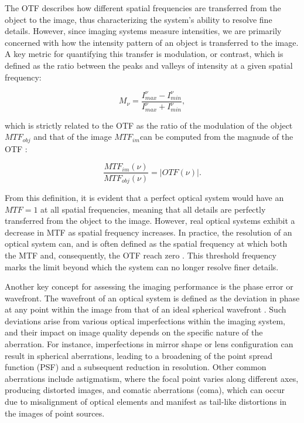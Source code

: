 The OTF describes how different spatial frequencies are transferred from the object to the image, thus characterizing the system's ability to resolve fine details. However, since imaging systems measure intensities, we are primarily concerned with how the intensity pattern of an object is transferred to the image. A key metric for quantifying this transfer is modulation, or contrast, which is defined as the ratio between the peaks and valleys of intensity at a given spatial frequency:

\begin{equation}
  M _ {\nu} = \frac{I_{max} ^{\nu} - I_{min} ^{\nu}}{I_{max} ^{\nu} + I_{min} ^{\nu}},
\end{equation}

which is strictly related to the OTF as the ratio of the modulation of the object $MTF_{obj}$ and that of the image $MTF_{im} $can be computed from the magnude of the OTF \citep{OTF}:

\begin{equation}
  \frac{MTF_{im}(\nu)}{MTF_{obj}(\nu)} = | OTF(\nu) |.
\end{equation}

From this definition, it is evident that a perfect optical system would have an $MTF=1$ at all spatial frequencies, meaning that all details are perfectly transferred from the object to the image. However, real optical systems exhibit a decrease in MTF as spatial frequency increases. In practice, the resolution of an optical system can, and is often defined as the spatial frequency at which both the MTF and, consequently, the OTF reach zero \citep{wfes}. This threshold frequency marks the limit beyond which the system can no longer resolve finer details. 

Another key concept for assessing the imaging performance is the phase error or wavefront. The wavefront of an optical system is defined as the deviation in phase at any point within the image from that of an ideal spherical wavefront \citep{WFE_def}. Such deviations arise from various optical imperfections within the imaging system, and their impact on image quality depends on the specific nature of the aberration. For instance, imperfections in mirror shape or lens configuration can result in spherical aberrations, leading to a broadening of the point spread function (PSF) and a subsequent reduction in resolution. Other common aberrations include astigmatism, where the focal point varies along different axes, producing distorted images, and comatic aberrations (coma), which can occur due to misalignment of optical elements and manifest as tail-like distortions in the images of point sources.

